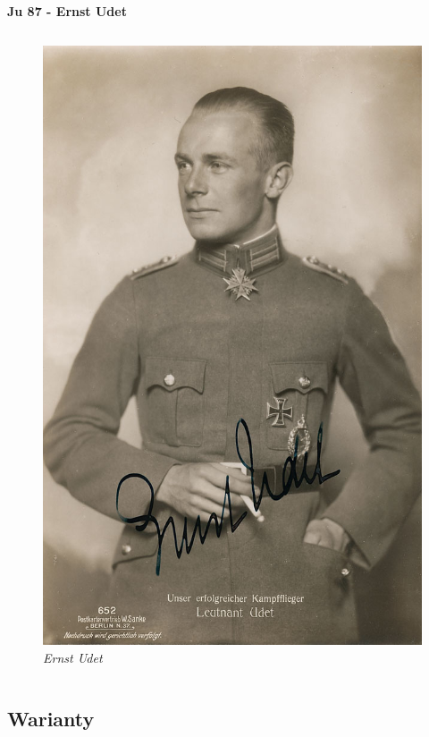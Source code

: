 \begin{frame}{\Huge{\textbf{Ju 87 - Ernst Udet}}}
\begin{columns}[t]
			\begin{figure}
				\centering
				\includegraphics[scale=0.18]{images/ju87-02.jpg}
				\caption{\textit{Ernst Udet}}
			\end{figure}
			
	\end{columns}
\end{frame}



\subsection{Warianty}


